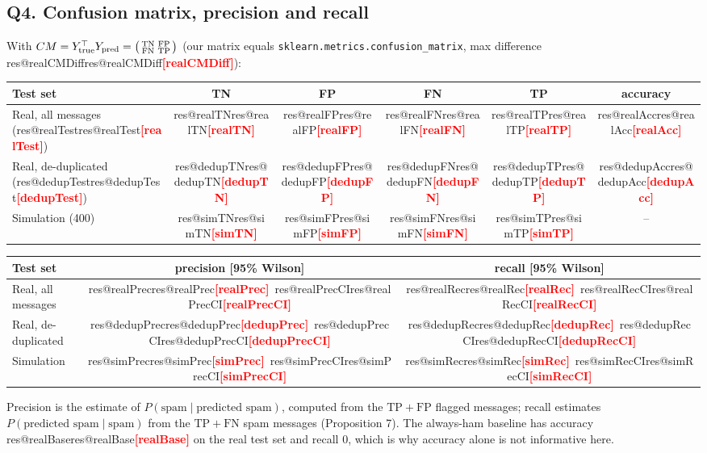 \documentclass[11pt]{article}
\makeatletter
\newcommand{\fillin}[1]{\textcolor{red}{\textbf{[#1]}}}
\newcommand{\res}[1]{\ifcsname res@#1\endcsname\csname res@#1\endcsname\else\fillin{#1}\fi}
\theoremstyle{plain}
\makeatother
\begin{document}
\subsection{Q4. Confusion matrix, precision and recall}\label{sec:q4}
With $CM=Y_{\text{true}}^\top Y_{\text{pred}}=\begin{psmallmatrix}\mathrm{TN}&\mathrm{FP}\\ \mathrm{FN}&\mathrm{TP}\end{psmallmatrix}$
(our matrix equals \texttt{sklearn.metrics.confusion\_matrix}, max difference \res{realCMDiff}):
\begin{center}
\small
\begin{tabular}{@{}lccccc@{}}
\toprule
Test set & TN & FP & FN & TP & accuracy\\
\midrule
Real, all messages (\res{realTest}) & \res{realTN} & \res{realFP} & \res{realFN} & \res{realTP} & \res{realAcc}\\
Real, de-duplicated (\res{dedupTest}) & \res{dedupTN} & \res{dedupFP} & \res{dedupFN} & \res{dedupTP} & \res{dedupAcc}\\
Simulation (400) & \res{simTN} & \res{simFP} & \res{simFN} & \res{simTP} & --\\
\bottomrule
\end{tabular}

\medskip
\begin{tabular}{@{}lcc@{}}
\toprule
Test set & precision [95\% Wilson] & recall [95\% Wilson]\\
\midrule
Real, all messages & \res{realPrec}\ \res{realPrecCI} & \res{realRec}\ \res{realRecCI}\\
Real, de-duplicated & \res{dedupPrec}\ \res{dedupPrecCI} & \res{dedupRec}\ \res{dedupRecCI}\\
Simulation & \res{simPrec}\ \res{simPrecCI} & \res{simRec}\ \res{simRecCI}\\
\bottomrule
\end{tabular}
\end{center}
Precision is the estimate of $P(\text{spam}\mid\text{predicted spam})$, computed from the
$\mathrm{TP}+\mathrm{FP}$ flagged messages; recall estimates $P(\text{predicted spam}\mid\text{spam})$
from the $\mathrm{TP}+\mathrm{FN}$ spam messages (Proposition 7). The always-ham baseline has accuracy
\res{realBase} on the real test set and recall 0, which is why accuracy alone is not informative here.
\end{document}
